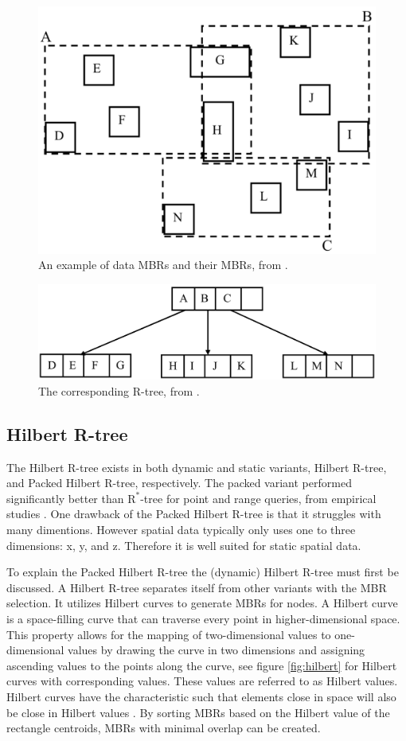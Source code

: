 \begin{figure}
    \centering
    \includegraphics[width=0.5\linewidth]{./figures/mbrs.png}
    \caption{An example of data MBRs and their MBRs, from \cite{rtree}.}
    \label{fig:mbrs}
\end{figure}
\begin{figure}
    \centering
    \includegraphics[width=\linewidth]{./figures/rtree.png}
    \caption{The corresponding R-tree, from \cite{rtree}.}
    \label{fig:rtree}
\end{figure}

\subsection{Hilbert R-tree}
The Hilbert R-tree exists in both dynamic and static variants, Hilbert R-tree, and Packed Hilbert R-tree, respectively. The packed variant performed significantly better than $\text{R}^*$-tree for point and range queries, from empirical studies \cite{rtree}. One drawback of the Packed Hilbert R-tree is that it struggles with many dimentions. However spatial data typically only uses one to three dimensions: x, y, and z. Therefore it is well suited for static spatial data.

To explain the Packed Hilbert R-tree the (dynamic) Hilbert R-tree must first be discussed. A Hilbert R-tree separates itself from other variants with the MBR selection. It utilizes Hilbert curves to generate MBRs for nodes. A Hilbert curve is a space-filling curve that can traverse every point in higher-dimensional space. This property allows for the mapping of two-dimensional values to one-dimensional values by drawing the curve in two dimensions and assigning ascending values to the points along the curve, see figure \ref{fig:hilbert} for Hilbert curves with corresponding values. These values are referred to as Hilbert values. Hilbert curves have the characteristic such that elements close in space will also be close in Hilbert values \cite{rtree}. By sorting MBRs based on the Hilbert value of the rectangle centroids, MBRs with minimal overlap can be created.

